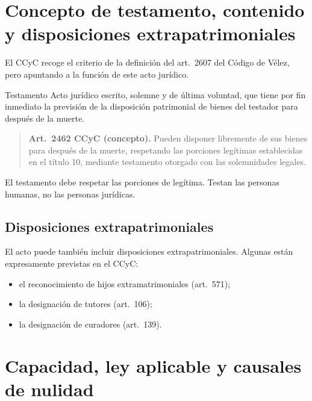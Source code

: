\documentclass[12pt,oneside]{book}
\begin{document}
\section{Concepto de testamento, contenido y disposiciones extrapatrimoniales}

El CCyC recoge el criterio de la definición del art.~2607 del Código de Vélez, pero apuntando a la función de este acto jurídico.

\begin{definition}{Testamento}
Acto jurídico escrito, solemne y de última voluntad, que tiene por fin inmediato la previsión de la disposición patrimonial de bienes del testador para después de la muerte.
\end{definition}

\begin{quote}
\textbf{Art.~2462 CCyC (concepto).} Pueden disponer libremente de sus bienes para después de la muerte, respetando las porciones legítimas establecidas en el título 10, mediante testamento otorgado con las solemnidades legales.
\end{quote}

El testamento debe respetar las porciones de legítima. Testan las personas humanas, no las personas jurídicas.

\subsection{Disposiciones extrapatrimoniales}

El acto puede también incluir disposiciones extrapatrimoniales. Algunas están expresamente previstas en el CCyC:

\begin{itemize}
    \item el reconocimiento de hijos extramatrimoniales (art.~571);
    \item la designación de tutores (art.~106);
    \item la designación de curadores (art.~139).
\end{itemize}

\section{Capacidad, ley aplicable y causales de nulidad}
\end{document}
